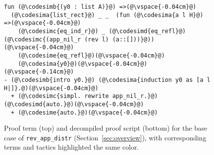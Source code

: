 \begin{figure}
\begin{lstlisting}
fun (@\codesimb{(y0 : list A)}@) =>(@\vspace{-0.04cm}@)
  (@\codesima{list_rect}@) _ _  (fun (@\codesima{a l H}@) =>(@\vspace{-0.04cm}@)
    (@\codesimc{eq_ind_r}@) _ (@\codesimd{eq_refl}@) (@\codesimc{(app_nil_r (rev l) (a::[]))}@))(@\vspace{-0.04cm}@)
    (@\codesime{eq_refl}@)(@\vspace{-0.04cm}@)
    (@\codesima{y0}@)(@\vspace{-0.04cm}@)
(@\vspace{-0.14cm}@)
- (@\codesimb{intro y0.}@) (@\codesima{induction y0 as [a l H|]}.@)(@\vspace{-0.04cm}@)
  + (@\codesimc{simpl. rewrite app_nil_r.}@) (@\codesimd{auto.}@)(@\vspace{-0.04cm}@)
  + (@\codesime{auto.}@)(@\vspace{-0.04cm}@)
\end{lstlisting}
\vspace{-0.4cm}
\caption{Proof term (top) and decompiled proof script (bottom) for the base case of 
\lstinline{rev_app_distr} (Section~\ref{sec:overview}), with corresponding terms and tactics 
highlighted the same color.}
\vspace{-0.25cm}
\label{fig:rainbow}
\end{figure}

